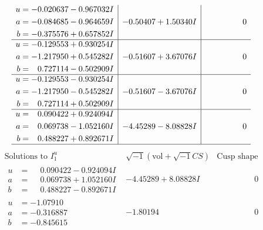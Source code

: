 \documentclass[1p]{elsarticle_modified}
\theoremstyle{definition}
\newcommand{\I}{\sqrt{-1}}
\begin{document}
$$\begin{array}{c|c|c}
\begin{aligned}
u &= -0.020637 - 0.967032 I \\
a &= -0.084685 - 0.964659 I \\
b &= -0.375576 + 0.657852 I\end{aligned}
 & -0.50407 + 1.50340 I & \phantom{-0.000000 } 0 \\ \hline\begin{aligned}
u &= -0.129553 + 0.930254 I \\
a &= -1.217950 + 0.545282 I \\
b &= \phantom{-}0.727114 - 0.502909 I\end{aligned}
 & -0.51607 + 3.67076 I & \phantom{-0.000000 } 0 \\ \hline\begin{aligned}
u &= -0.129553 - 0.930254 I \\
a &= -1.217950 - 0.545282 I \\
b &= \phantom{-}0.727114 + 0.502909 I\end{aligned}
 & -0.51607 - 3.67076 I & \phantom{-0.000000 } 0 \\ \hline\begin{aligned}
u &= \phantom{-}0.090422 + 0.924094 I \\
a &= \phantom{-}0.069738 - 1.052160 I \\
b &= \phantom{-}0.488227 + 0.892671 I\end{aligned}
 & -4.45289 - 8.08828 I & \phantom{-0.000000 } 0\\
 \hline 
 \end{array}$$\newpage$$\begin{array}{c|c|c}  
\text{Solutions to }I^u_{1}& \I (\text{vol} + \sqrt{-1}CS) & \text{Cusp shape}\\
 \hline 
\begin{aligned}
u &= \phantom{-}0.090422 - 0.924094 I \\
a &= \phantom{-}0.069738 + 1.052160 I \\
b &= \phantom{-}0.488227 - 0.892671 I\end{aligned}
 & -4.45289 + 8.08828 I & \phantom{-0.000000 } 0 \\ \hline\begin{aligned}
u &= -1.07910\phantom{ +0.000000I} \\
a &= -0.316887\phantom{ +0.000000I} \\
b &= -0.845615\phantom{ +0.000000I}\end{aligned}
 & -1.80194\phantom{ +0.000000I} & \phantom{-0.000000 } 0 \\ \hline\begin{aligned}

\end{aligned}
\end{array}$$
\end{document}
